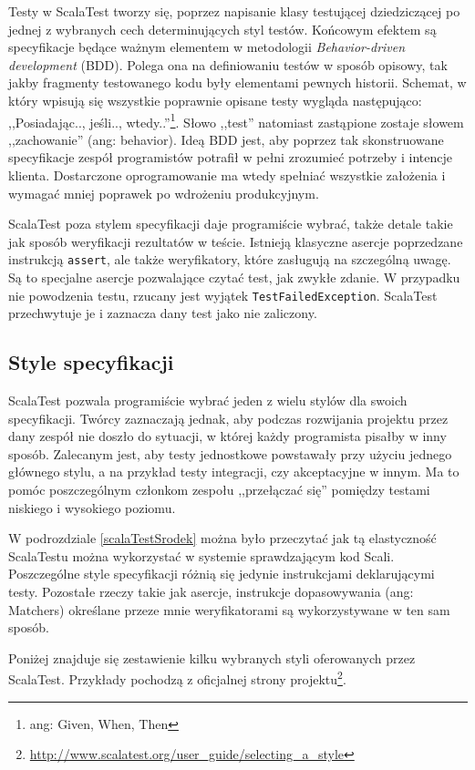 \documentclass[brudnopis]{xmgr}
\begin{document}
Testy w ScalaTest tworzy się, poprzez napisanie klasy testującej dziedziczącej po jednej z wybranych cech determinujących styl testów. Końcowym efektem są specyfikacje będące ważnym elementem w metodologii \emph{Behavior-driven development} (BDD). Polega ona na definiowaniu testów w sposób opisowy, tak jakby fragmenty testowanego kodu były elementami pewnych historii. Schemat, w który wpisują się wszystkie poprawnie opisane testy wygląda następująco: ,,Posiadając.., jeśli.., wtedy..''\footnote{ang: Given, When, Then}. Słowo ,,test'' natomiast zastąpione zostaje słowem ,,zachowanie'' (ang: behavior). Ideą BDD jest, aby poprzez tak skonstruowane specyfikacje zespół programistów potrafił w pełni zrozumieć potrzeby i intencje klienta. Dostarczone oprogramowanie ma wtedy spełniać wszystkie założenia i wymagać mniej poprawek po wdrożeniu produkcyjnym.

ScalaTest poza stylem specyfikacji daje programiście wybrać, także detale takie jak sposób weryfikacji rezultatów w teście. Istnieją klasyczne asercje poprzedzane instrukcją \texttt{assert}, ale także weryfikatory, które zasługują na szczególną uwagę. Są to specjalne asercje pozwalające czytać test, jak zwykłe zdanie. W przypadku nie powodzenia testu, rzucany jest wyjątek \texttt{TestFailedException}. ScalaTest przechwytuje je i zaznacza dany test jako nie zaliczony.

\subsection{Style specyfikacji}

ScalaTest pozwala programiście wybrać jeden z wielu stylów dla swoich specyfikacji. Twórcy zaznaczają jednak, aby podczas rozwijania projektu przez dany zespół nie doszło do sytuacji, w której każdy programista pisałby w inny sposób. Zalecanym jest, aby testy jednostkowe powstawały przy użyciu jednego głównego stylu, a na przykład testy integracji, czy akceptacyjne w innym. Ma to pomóc poszczególnym członkom zespołu ,,przełączać się'' pomiędzy testami niskiego i wysokiego poziomu.

W podrozdziale \ref{scalaTestSrodek} można było przeczytać jak tą elastyczność ScalaTestu można wykorzystać w systemie sprawdzającym kod Scali. Poszczególne style specyfikacji różnią się jedynie instrukcjami deklarującymi testy. Pozostałe rzeczy takie jak asercje, instrukcje dopasowywania (ang: Matchers) określane przeze mnie weryfikatorami są wykorzystywane w ten sam sposób.

Poniżej znajduje się zestawienie kilku wybranych styli oferowanych przez ScalaTest. Przykłady pochodzą z oficjalnej strony projektu\footnote{\url{http://www.scalatest.org/user_guide/selecting_a_style}}.
\end{document}
